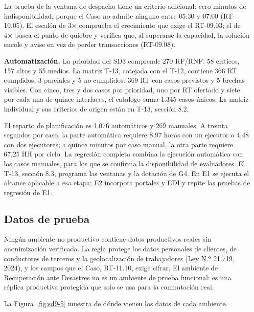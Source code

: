 La prueba de la ventana de despacho tiene un criterio adicional: cero minutos de indisponibilidad, porque el Caso no admite ninguno entre 05:30 y 07:00 (RT-10.05). El escalón de 3× comprueba el crecimiento que exige el RT-09.03; el de 4× busca el punto de quiebre y verifica que, al superarse la capacidad, la solución encole y avise en vez de perder transacciones (RT-09.08).

\textbf{Automatización.} La prioridad del SD3 comprende 270 RF/RNF: 58 críticos, 157 altos y 55 medios. La matriz T-13, cotejada con el T-12, contiene 366 RT cumplidos, 3 parciales y 5 no cumplidos: 369 RT con casos previstos y 5 brechas visibles. Con cinco, tres y dos casos por prioridad, uno por RT ofertado y siete por cada una de quince interfaces, el catálogo suma 1.345 casos únicos. La matriz individual y sus criterios de origen están en T-13, sección 8.2.

El reparto de planificación es 1.076 automáticos y 269 manuales. A treinta segundos por caso, la parte automática requiere 8,97 horas con un ejecutor o 4,48 con dos ejecutores; a quince minutos por caso manual, la otra parte requiere 67,25 HH por ciclo. La regresión completa combina la ejecución automática con los casos manuales, para los que se confirma la disponibilidad de evaluadores. El T-13, sección 8.3, programa las ventanas y la dotación de G4. En E1 se ejecuta el alcance aplicable a esa etapa; E2 incorpora portales y EDI y repite las pruebas de regresión de E1.

\subsection{Datos de prueba}

Ningún ambiente no productivo contiene datos productivos reales sin anonimización verificada. La regla protege los datos personales de clientes, de conductores de terceros y la geolocalización de trabajadores (Ley N.º 21.719, 2024), y los campos que el Caso, RT-11.10, exige cifrar. El ambiente de Recuperación ante Desastres no es un ambiente de prueba funcional: es una réplica productiva protegida que solo se usa para la conmutación real.

La Figura~\ref{fig:sd9-5} muestra de dónde vienen los datos de cada ambiente.


